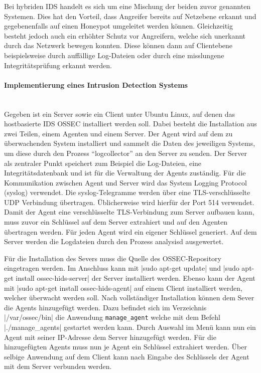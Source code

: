 \noindent Bei hybriden \ac{IDS} handelt es sich um eine Mischung der beiden zuvor genannten Systemen. Dies hat den Vorteil, dass Angreifer bereits auf Netzebene erkannt und gegebenenfalls auf einen Honeypot umgeleitet werden können. Gleichzeitig besteht jedoch auch ein erhöhter Schutz vor Angreifern, welche sich unerkannt durch das Netzwerk bewegen konnten. Diese können dann auf Clientebene beispielsweise durch auffällige Log-Dateien oder durch eine misslungene Integritätsprüfung erkannt werden.

\paragraph{Implementierung eines Intrusion Detection Systems}

\noindent \\Gegeben ist ein Server sowie ein Client unter Ubuntu Linux, auf denen das hostbasierte IDS OSSEC installiert werden soll. Dabei besteht die Installation aus zwei Teilen, einem Agenten und einem Server. Der Agent wird auf dem zu überwachenden System installiert und sammelt die Daten des jeweiligen Systems, um diese durch den Prozess "`logcollector"' an den Server zu senden. Der Server als zentraler Punkt speichert zum Beispiel die Log-Dateien, eine Integritätsdatenbank und ist für die Verwaltung der Agents zuständig. Für die Kommunikation zwischen Agent und Server wird das System Logging Protocol (syslog) verwendet. Die syslog-Telegramme werden über eine \ac{TLS}-verschlüsselte UDP Verbindung übertragen. Üblicherweise wird hierfür der Port 514 verwendet. Damit der Agent eine verschlüsselte \ac{TLS}-Verbindung zum Server aufbauen kann, muss zuvor ein Schlüssel auf dem Server extrahiert und auf den Agenten übertragen werden. Für jeden Agent wird ein eigener Schlüssel generiert. Auf dem Server werden die Logdateien durch den Prozess analysisd ausgewertet.

\noindent Für die Installation des Severs muss die Quelle des OSSEC-Repository eingetragen werden. Im Anschluss kann mit |sudo apt-get update| und |sudo apt-get install ossec-hids-server| der Server installiert werden. 
Ebenso kann der Agent mit |sudo apt-get install ossec-hids-agent| auf einem Client installiert werden, welcher überwacht werden soll. Nach vollständiger Installation können dem Sever die Agents hinzugefügt werden. Dazu befindet sich im Verzeichnis |/var/ossec/bin| die Anwendung \verb+manage_agent+ welche mit dem Befehl |./manage_agents| gestartet werden kann. 
Durch Auswahl im Menü kann nun ein Agent mit seiner IP-Adresse dem Server hinzugefügt werden. Für die hinzugefügten Agents muss nun je Agent ein Schlüssel extrahiert werden. Über selbige Anwendung auf dem Client kann nach Eingabe des Schlüssels der Agent mit dem Server verbunden werden.\\

